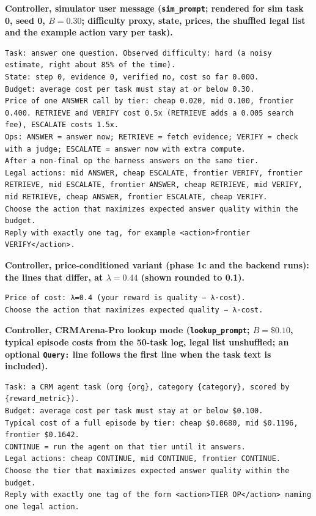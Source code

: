 \documentclass[10pt]{article}
\newcommand{\code}[1]{\texttt{#1}}
\newcommand{\prompttitle}[1]{\par\vspace{7pt}\noindent\textbf{#1}\par\nopagebreak\vspace{3pt}}
\begin{document}
\prompttitle{Controller, simulator user message (\code{sim\_prompt}; rendered for sim task 0, seed 0, $B=0.30$; difficulty proxy, state, prices, the shuffled legal list and the example action vary per task).}
\begin{lstlisting}
Task: answer one question. Observed difficulty: hard (a noisy estimate, right about 85% of the time).
State: step 0, evidence 0, verified no, cost so far 0.000.
Budget: average cost per task must stay at or below 0.30.
Price of one ANSWER call by tier: cheap 0.020, mid 0.100, frontier 0.400. RETRIEVE and VERIFY cost 0.5x (RETRIEVE adds a 0.005 search fee), ESCALATE costs 1.5x.
Ops: ANSWER = answer now; RETRIEVE = fetch evidence; VERIFY = check with a judge; ESCALATE = answer now with extra compute.
After a non-final op the harness answers on the same tier.
Legal actions: mid ANSWER, cheap ESCALATE, frontier VERIFY, frontier RETRIEVE, mid ESCALATE, frontier ANSWER, cheap RETRIEVE, mid VERIFY, mid RETRIEVE, cheap ANSWER, frontier ESCALATE, cheap VERIFY.
Choose the action that maximizes expected answer quality within the budget.
Reply with exactly one tag, for example <action>frontier VERIFY</action>.
\end{lstlisting}

\prompttitle{Controller, price-conditioned variant (phase 1c and the backend runs): the lines that differ, at $\lambda=0.44$ (shown rounded to 0.1).}
\begin{lstlisting}
Price of cost: λ=0.4 (your reward is quality − λ·cost).
Choose the action that maximizes expected quality − λ·cost.
\end{lstlisting}

\prompttitle{Controller, CRMArena-Pro lookup mode (\code{lookup\_prompt}; $B=\$0.10$, typical episode costs from the 50-task log, legal list unshuffled; an optional \code{Query:} line follows the first line when the task text is included).}
\begin{lstlisting}
Task: a CRM agent task (org {org}, category {category}, scored by {reward_metric}).
Budget: average cost per task must stay at or below $0.100.
Typical cost of a full episode by tier: cheap $0.0680, mid $0.1196, frontier $0.1642.
CONTINUE = run the agent on that tier until it answers.
Legal actions: cheap CONTINUE, mid CONTINUE, frontier CONTINUE.
Choose the tier that maximizes expected answer quality within the budget.
Reply with exactly one tag of the form <action>TIER OP</action> naming one legal action.
\end{lstlisting}
\end{document}
